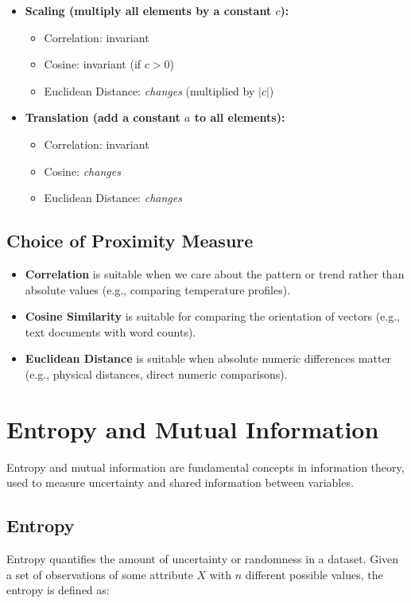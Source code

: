\documentclass[a4paper,12pt]{article}
\begin{document}
\begin{itemize}
  \item \textbf{Scaling (multiply all elements by a constant $c$):}
  \begin{itemize}
    \item Correlation: invariant
    \item Cosine: invariant (if $c > 0$)
    \item Euclidean Distance: \emph{changes} (multiplied by $|c|$)
  \end{itemize}
  \item \textbf{Translation (add a constant $a$ to all elements):}
  \begin{itemize}
    \item Correlation: invariant
    \item Cosine: \emph{changes}
    \item Euclidean Distance: \emph{changes}
  \end{itemize}
\end{itemize}

\subsection*{Choice of Proximity Measure}

\begin{itemize}
  \item \textbf{Correlation} is suitable when we care about the pattern or trend rather than absolute values (e.g., comparing temperature profiles).
  \item \textbf{Cosine Similarity} is suitable for comparing the orientation of vectors (e.g., text documents with word counts).
  \item \textbf{Euclidean Distance} is suitable when absolute numeric differences matter (e.g., physical distances, direct numeric comparisons).
\end{itemize}

\section{Entropy and Mutual Information}

Entropy and mutual information are fundamental concepts in information theory, used to measure uncertainty and shared information between variables.

\subsection{Entropy}
Entropy quantifies the amount of uncertainty or randomness in a dataset. Given a set of observations of some attribute \(X\) with \(n\) different possible values, the entropy is defined as:
\end{document}
